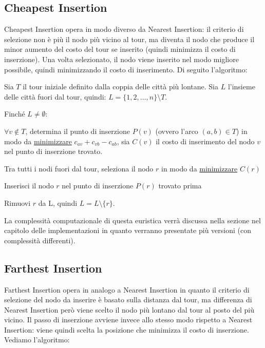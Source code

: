 \documentclass[a4paper,12pt]{report}
\begin{document}
\subsection{Cheapest Insertion} \label{ssec:CI}
Cheapest Insertion opera in modo diverso da Nearest Insertion: il criterio di selezione non è più il nodo più vicino al tour, ma diventa il nodo che produce il minor aumento del costo del tour se inserito (quindi minimizza il costo di inserzione). Una volta selezionato, il nodo viene inserito nel modo migliore possibile, quindi minimizzando il costo di inserimento. Di seguito l'algoritmo:

\begin{tcolorbox}[colframe=black,colback=white,boxrule=0.5pt, sharp corners]
  \begin{legal}
    \item Sia $T$ il tour iniziale definito dalla coppia delle città più lontane. Sia $L$ l'insieme delle città fuori dal tour, quindi: $L = \{1, 2, ..., n\} \setminus T$.
    \item Finché $L \neq \emptyset$:
    \begin{legal}
      \item $\forall v \not \in T$, determina il punto di inserzione $P(v)$ (ovvero l'arco $(a, b) \in T$) in modo da \underline{minimizzare} $c_{av} + c_{vb} - c_{ab}$, sia $C(v)$ il costo di inserimento del nodo $v$ nel punto di inserzione trovato.
      \item Tra tutti i nodi fuori dal tour, seleziona il nodo $r$ in modo da \underline{minimizzare} $C(r)$
      \item Inserisci il nodo $r$ nel punto di inserzione $P(r)$ trovato prima
      \item Rimuovi $r$ da L, quindi $L = L \setminus \{r\}$.
    \end{legal}
  \end{legal}
  \end{tcolorbox}
\hfill \break La complessità computazionale di questa euristica verrà discussa nella sezione nel capitolo delle implementazioni in quanto verranno presentate più versioni (con complessità differenti).

\subsection{Farthest Insertion} \label{ssec:FaI}
Farthest Insertion opera in analogo a Nearest Insertion in quanto il criterio di selezione del nodo da inserire è basato sulla distanza dal tour, ma differenza di Nearest Insertion però viene scelto il nodo più lontano dal tour al posto del più vicino. Il passo di inserzione avviene invece allo stesso modo rispetto a Nearest Insertion: viene quindi scelta la posizione che minimizza il costo di inserzione. Vediamo l'algoritmo:
\end{document}

